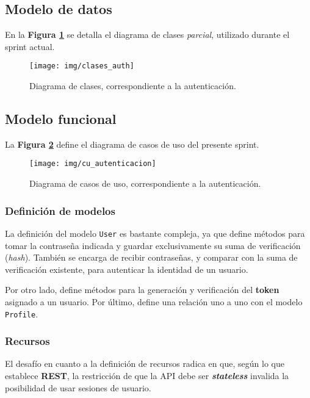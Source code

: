 


\subsection{Modelo de datos}

En la \textbf{Figura \ref{5-clase_autenticacion}} se detalla el diagrama de clases \textit{parcial}, utilizado durante el sprint actual.

\begin{figure}[h]
        \centering
        \texttt{[image: img/clases\_auth]}
        \caption{Diagrama de clases, correspondiente a la autenticación.}
		\label{5-clase_autenticacion}
    \end{figure}


\subsection{Modelo funcional} 
La \textbf{Figura \ref{4-cu_autenticacion}} define el diagrama de casos de uso del presente sprint.

    \begin{figure}[h]
        \centering
        \texttt{[image: img/cu\_autenticacion]}
        \caption{Diagrama de casos de uso, correspondiente a la autenticación.}
		\label{4-cu_autenticacion}
    \end{figure}


\subsubsection{Definición de modelos}

La definición del modelo \texttt{User} es bastante compleja, ya que define métodos para tomar la contraseña indicada y guardar exclusivamente su suma de verificación (\textit{hash}).
También se encarga de recibir contraseñas, y comparar con la suma de verificación existente, para autenticar la identidad de un usuario.

Por otro lado, define métodos para la generación y verificación del \textbf{token} asignado a un usuario.
Por último, define una relación uno a uno con el modelo \texttt{Profile}.


\subsubsection{Recursos}

El desafío en cuanto a la definición de recursos radica en que, según lo que establece \textbf{REST}, la restricción de que la API debe ser \textbf{\textit{stateless}} invalida la posibilidad de usar sesiones de usuario.

